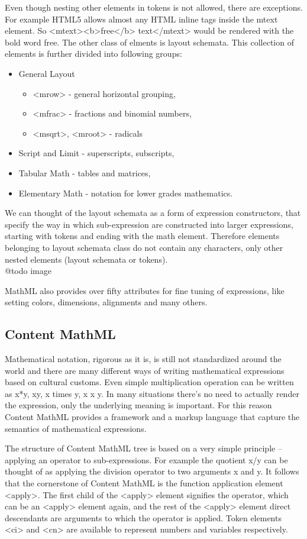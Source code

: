\documentclass[11pt,oneside,final]{fithesis2}
\begin{document}
Even though nesting other elements in tokens is not allowed, there are exceptions. For example HTML5 allows almost any HTML inline tags inside the mtext element. So <mtext><b>free</b> text</mtext> would be rendered with the bold word free.
The other class of elments is layout schemata. This collection of elements is further divided into following groups:
\begin{itemize}
\item General Layout
	\begin{itemize}
	\item <mrow> - general horizontal grouping,
	\item <mfrac> - fractions and binomial numbers,
	\item <msqrt>, <mroot> - radicals
	\end{itemize}
\item Script and Limit - superscripts, subscripts, 
\item Tabular Math - tables and matrices,
\item Elementary Math - notation for lower grades mathematics.
\end{itemize}
We can thought of the layout schemata as a form of expression constructors, that specify the way in which sub-expression are constructed into larger expressions, starting with tokens and ending with the math element. Therefore elements belonging to layout schemata class do not contain any characters, only other nested elements (layout schemata or tokens). 
\\
@todo image

MathML also provides over fifty attributes for fine tuning of expressions, like setting colors, dimensions, alignments and many others.

\subsection{Content MathML}
Mathematical notation, rigorous as it is, is still not standardized around the world and there are many different ways of writing mathematical expressions based on cultural customs. Even simple multiplication operation can be written as x*y, xy, x times y, x x y. In many situations there's no need to actually render the expression, only the underlying meaning is important. For this reason Content MathML provides a framework and a markup language that capture the semantics of mathematical expressions.

The structure of Content MathML tree is based on a very simple principle – applying an operator to sub-expressions. For example the quotient x/y can be thought of as applying the division operator to two arguments x and y. It follows that the cornerstone of Content MathML is the function application element <apply>.  The first child of the <apply> element signifies the operator, which can be an <apply> element again, and the rest of the <apply> element direct descendants are arguments to which the operator is applied. Token elements <ci> and <cn> are available to represent numbers and variables respectively. 
\end{document}
